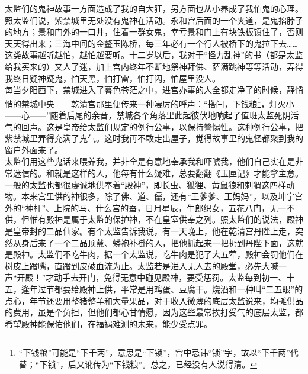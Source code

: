 太监们的鬼神故事一方面造成了我的自大狂，另方面也从小养成了我怕鬼的心理。照太监们说，紫禁城里无处没有鬼神在活动。永和宫后面的一个夹道，是鬼掐脖子的地方；景和门外的一口井，住着一群女鬼，幸亏景和门上有块铁板镇住了，否则天天得出来；三海中间的金鳌玉陈桥，每三年必有一个行人被桥下的鬼拉下去……这类故事越听越怕，越怕越要听。十二岁以后，我对于“怪力乱神”的书（都是太监给我买来的）又人了迷，加上宫内终年不断地祭神拜佛、萨满跳神等等活动，弄得我终日疑神疑鬼，怕天黑，怕打雷，怕打闪，怕屋里没人。\\

每当夕阳西下，禁城进入了暮色苍茫之中，进宫办事的人全都走净了的时候，静悄悄的禁城中央——乾清宫那里便传来一种凄厉的呼声：“搭闩，下钱粮\footnote{“下钱粮”可能是“下千两”，意思是“下锁”，宫中忌讳“锁”字，故以“下千两”代替；“下锁”，后又讹传为“下钱粮”。总之，已经没有人说得清。}，灯火小——心——”随着后尾的余音，禁城各个角落里此起彼伏地响起了值班太监死阴活气的回声。这是皇帝给太监们规定的例行公事，以保持警惕性。这种例行公事，把紫禁城里弄得充满了鬼气。这时我再不敢走出屋子，觉得故事里的鬼怪都聚到我的窗户外面来了。\\

太监们用这些鬼话来喂养我，并非全是有意地奉承我和吓唬我，他们自己实在是非常迷信的。和就是这样的人，他每有什么疑难，总要翻翻《玉匣记》才能拿主意。一般的太监也都很虔诚地供奉着“殿神”，即长虫、狐狸、黄鼠狼和刺猬这四样动物。本来宫里供的神很多，除了佛、道、儒，还有“王爹爹、王妈妈”，以及坤宁宫外的“神杆”、上院的马、什么宫的蚕，日月星辰，牛郎织女，五花八门，无一不供，但惟有殿神是属于太监的保护神，不在皇室供奉之列。照太监们的说法，殿神是皇帝封的二品仙家。有个太监告诉我说，有一天晚上，他在乾清宫丹陛上走，突然从身后来了一个二品顶戴、蟒袍补褂的人，把他抓起来一把扔到丹陛下面，这就是殿神。太监们不吃牛肉，据一个太监说，吃牛肉是犯了大五荤，殿神会罚他们在树皮上蹭嘴，直蹭到皮破血流为止。太监若是进入无人去的殿堂，必先大喊一声“开殿！”才动手去开门，免得无意中碰见殿神，要受惩罚。太监每到初一、十五，逢年过节都要给殿神上供，平常是用鸡蛋、豆腐干。烧酒和一种叫“二五眼”的点心，年节还要用整猪整羊和大量果品，对于收入微薄的底层太监说来，均摊供品的费用，虽是个负担，但他们都心甘情愿，因为这些最常挨打受气的底层太监，都希望殿神能保佑他们，在福祸难测的未来，能少受点罪。\\

